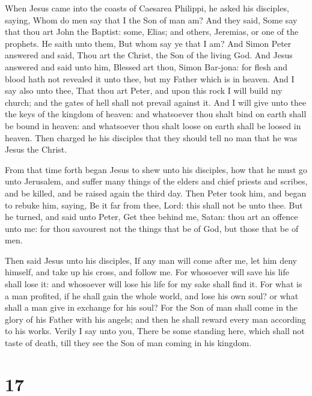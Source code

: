  When Jesus came into the coasts of Caesarea Philippi, he
asked his disciples, saying, Whom do men say that I the Son of man am?
 And they said, Some say that thou art John the Baptist:
some, Elias; and others, Jeremias, or one of the prophets.
 He saith unto them, But whom say ye that I am?
 And Simon Peter answered and said, Thou art the Christ,
the Son of the living God.  And Jesus answered and said
unto him, Blessed art thou, Simon Bar-jona: for flesh and blood hath not
revealed it unto thee, but my Father which is in heaven. 
And I say also unto thee, That thou art Peter, and upon this rock I will
build my church; and the gates of hell shall not prevail against it.
 And I will give unto thee the keys of the kingdom of
heaven: and whatsoever thou shalt bind on earth shall be bound in
heaven: and whatsoever thou shalt loose on earth shall be loosed in
heaven.  Then charged he his disciples that they should
tell no man that he was Jesus the Christ.

 From that time forth began Jesus to shew unto his
disciples, how that he must go unto Jerusalem, and suffer many things of
the elders and chief priests and scribes, and be killed, and be raised
again the third day.  Then Peter took him, and began to
rebuke him, saying, Be it far from thee, Lord: this shall not be unto
thee.  But he turned, and said unto Peter, Get thee
behind me, Satan: thou art an offence unto me: for thou savourest not
the things that be of God, but those that be of men.

 Then said Jesus unto his disciples, If any man will come
after me, let him deny himself, and take up his cross, and follow me.
 For whosoever will save his life shall lose it: and
whosoever will lose his life for my sake shall find it. 
For what is a man profited, if he shall gain the whole world, and lose
his own soul? or what shall a man give in exchange for his soul?
 For the Son of man shall come in the glory of his Father
with his angels; and then he shall reward every man according to his
works.  Verily I say unto you, There be some standing
here, which shall not taste of death, till they see the Son of man
coming in his kingdom.

\hypertarget{section-16}{%
\section{17}\label{section-16}}


